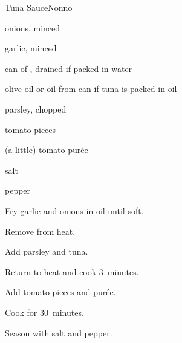 \begin{recipe}{Tuna Sauce}{Nonno}{}

\begin{ingredients}
\item onions, minced
\item garlic, minced
\item can of , drained if packed in water
\item olive oil or oil from can if tuna is packed in oil
\item parsley, chopped
\item tomato pieces
\item (a little) tomato pur\'ee
\item salt
\item pepper
\end{ingredients}

\begin{directions}
\item Fry garlic and onions in oil until soft.
\item Remove from heat.
\item Add parsley and tuna.
\item Return to heat and cook 3~minutes.
\item Add tomato pieces and pur\'ee.
\item Cook for 30~minutes.
\item Season with salt and pepper.
\end{directions}

\end{recipe}
